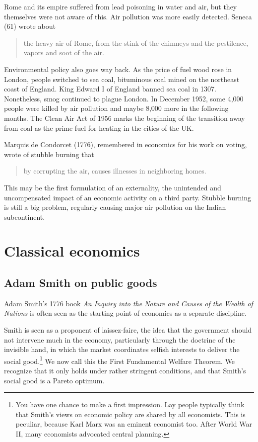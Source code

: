 Rome and its empire suffered from lead poisoning in water and air, but they themselves were not aware of this. Air pollution was more easily detected. Seneca (61) wrote about
\begin{quote}
    the heavy air of Rome, from the stink of the chimneys and the pestilence, vapors and soot of the air.
\end{quote} 

Environmental policy also goes way back. As the price of fuel wood rose in London, people switched to sea coal, bituminous coal mined on the northeast coast of England. King Edward I of England banned sea coal in 1307. Nonetheless, smog continued to plague London. In December 1952, some 4,000 people were killed by air pollution and maybe 8,000 more in the following months. The Clean Air Act of 1956 marks the beginning of the transition away from coal as the prime fuel for heating in the cities of the UK.

Marquis de Condorcet (1776), remembered in economics for his work on voting, wrote of stubble burning that
\begin{quote}
    by corrupting the air, causes illnesses in neighboring homes.
\end{quote}
This may be the first formulation of an externality, the unintended and uncompensated impact of an economic activity on a third party. Stubble burning is still a big problem, regularly causing major air pollution on the Indian subcontinent.

\section{Classical economics}

\subsection{Adam Smith on public goods}
Adam Smith's 1776 book \emph{An Inquiry into the Nature and Causes of the Wealth of Nations} is often seen as the starting point of economics as a separate discipline.

Smith is seen as a proponent of laissez-faire, the idea that the government should not intervene much in the economy, particularly through the doctrine of the invisible hand, in which the market coordinates selfish interests to deliver the social good.\footnote{You have one chance to make a first impression. Lay people typically think that Smith's views on economic policy are shared by all economists. This is peculiar, because Karl Marx was an eminent economist too. After World War II, many economists advocated central planning.} We now call this the First Fundamental Welfare Theorem. We recognize that it only holds under rather stringent conditions, and that Smith's social good is a Pareto optimum.

